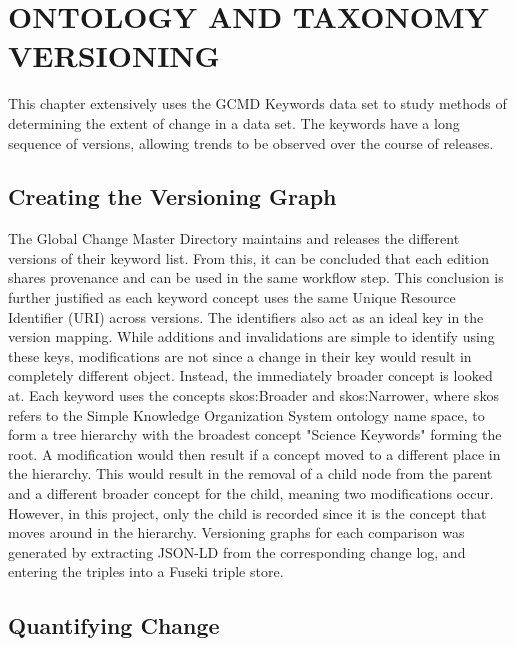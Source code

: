 
\chapter{ONTOLOGY AND TAXONOMY VERSIONING}

This chapter extensively uses the GCMD Keywords data set to study methods of determining the extent of change in a data set.
The keywords have a long sequence of versions, allowing trends to be observed over the course of releases.

\section{Creating the Versioning Graph}

The Global Change Master Directory maintains and releases the different versions of their keyword list.
From this, it can be concluded that each edition shares provenance and can be used in the same workflow step.
This conclusion is further justified as each keyword concept uses the same Unique Resource Identifier (URI) across versions.
The identifiers also act as an ideal key in the version mapping.
While additions and invalidations are simple to identify using these keys, modifications are not since a change in their key would result in completely different object.
Instead, the immediately broader concept is looked at.
Each keyword uses the concepts skos:Broader and skos:Narrower, where skos refers to the Simple Knowledge Organization System ontology name space, to form a tree hierarchy with the broadest concept "Science Keywords" forming the root.
A modification would then result if a concept moved to a different place in the hierarchy.
This would result in the removal of a child node from the parent and a different broader concept for the child, meaning two modifications occur.
However, in this project, only the child is recorded since it is the concept that moves around in the hierarchy.
Versioning graphs for each comparison was generated by extracting JSON-LD from the corresponding change log, and entering the triples into a Fuseki triple store.

\section{Quantifying Change}

